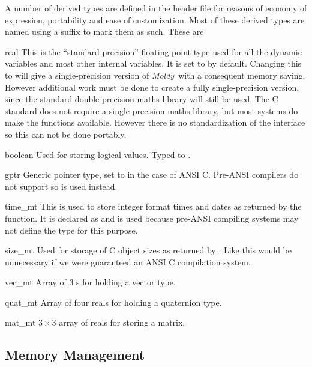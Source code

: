 \documentclass[a4paper,twoside]{report}
\newcommand{\moldy}{\emph{Moldy}}
\begin{document}
A number of derived types are defined in the header file
 for reasons of economy of expression, portability and
ease of customization.  Most of these derived types are named using a
suffix  to mark them as such.  These are
\begin{Litdescription}
\item[real] This is the ``standard precision'' floating-point type
  used for all the dynamic variables and most other internal
  variables. It is set to  by default. Changing this to
   will give a single-precision version of \moldy\ with
  a consequent memory saving.  However additional work must be done to
  create a fully single-precision version, since the standard
  double-precision maths library will still be used.  The C standard
  does not require a single-precision maths library, but most systems
  do make the functions available. However there is no
  standardization of the interface so this can not be done portably.
\item[boolean] Used for storing logical values.  Typed to
  .
\item[gptr] Generic pointer type, set to  in the case of ANSI C.
  Pre-ANSI compilers do not support  so  is
  used instead.
\item[time\_mt] This is used to store integer format times and dates as
  returned by the  function.  It is declared as
   and is used because pre-ANSI compiling
  systems may not define the  type for this purpose.
\item[size\_mt] Used for storage of C object sizes as returned by
  .  Like  this would be unnecessary if
  we were guaranteed an ANSI C compilation system.
\item[vec\_mt] Array of 3 s for holding a vector type.
\item[quat\_mt] Array of four reals for holding a quaternion type.
\item[mat\_mt] $3 \times 3$ array of reals for storing a matrix.
\end{Litdescription}

\subsection{Memory Management}
\end{document}

